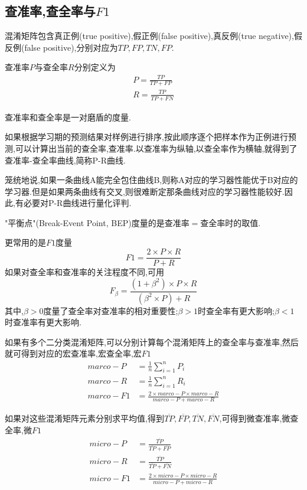 \subsection{查准率,查全率与$F1$}

混淆矩阵包含真正例(true positive),假正例(false positive),真反例(true negative),假反例(false positive),分别对应为$TP,FP,TN,FP$.

查准率$P$与查全率$R$分别定义为
\begin{equation}\begin{split}
P=\frac{TP}{TP+FP}\\
R=\frac{TP}{TP+FN}
\end{split}\end{equation}

查准率和查全率是一对磨盾的度量.

如果根据学习期的预测结果对样例进行排序,按此顺序逐个把样本作为正例进行预测,可以计算出当前的查全率,查准率.以查准率为纵轴,以查全率作为横轴,就得到了查准率-查全率曲线,简称P-R曲线.

笼统地说,如果一条曲线A能完全包住曲线B,则称A对应的学习器性能优于B对应的学习器.但是如果两条曲线有交叉,则很难断定那条曲线对应的学习器性能较好.因此,有必要对P-R曲线进行量化评判.

"平衡点"(Break-Event Point, BEP)度量的是$查准率=查全率$时的取值.

更常用的是$F1$度量
\begin{equation}
F1=\frac{2\times P\times R}{P+R}
\end{equation}
如果对查全率和查准率的关注程度不同,可用
\begin{equation}
F_\beta=\frac{(1+\beta^2)\times P\times R}{(\beta^2\times P)+R}
\end{equation}
其中,$\beta>0$度量了查全率对查准率的相对重要性;$\beta>1$时查全率有更大影响;$\beta<1$时查准率有更大影响.

如果有多个二分类混淆矩阵,可以分别计算每个混淆矩阵上的查全率与查准率,然后就可得到对应的宏查准率,宏查全率,宏$F1$
\begin{equation}\begin{split}
marco-P&=\frac{1}{n}\sum_{i=1}^nP_i\\
marco-R&=\frac{1}{n}\sum_{i=1}^nR_i\\
marco-F1&=\frac{2\times marco-P \times marco-R}{marco-P+marco-R}
\end{split}\end{equation}

如果对这些混淆矩阵元素分别求平均值,得到$\overline{TP},\overline{FP},\overline{TN},\overline{FN}$,可得到微查准率,微查全率,微$F1$
\begin{equation}\begin{split}
micro-P&=\frac{\overline{TP}}{\overline{TP}+\overline{FP}}\\
micro-R&=\frac{\overline{TP}}{\overline{TP}+\overline{FN}}\\
micro-F1&=\frac{2\times micro-P \times micro-R}{micro-P+micro-R}
\end{split}\end{equation}


